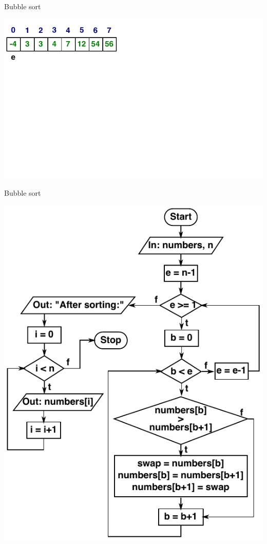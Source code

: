 \documentclass[usenames,dvipsnames,aspectratio=169]{beamer}
\begin{document}
\begin{frame}{Bubble sort}
  \begin{center}
    \includegraphics[scale=.9]{bubble_animation8.pdf}
  \end{center}
\end{frame}

\begin{frame}{Bubble sort}
  \begin{center}
    \includegraphics[scale=0.55]{bubble.pdf}
  \end{center}
\end{frame}
\end{document}
